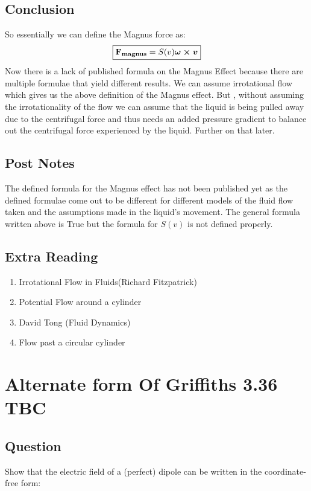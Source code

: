 \documentclass{article}
\begin{document}
\subsection{Conclusion}
So essentially we can define the Magnus force as:
\begin{align*}
\fbox{$\vb{F_{magnus}} = S(v)\vb*{\omega\times v}$}
\end{align*}
Now there is a lack of published formula on the Magnus Effect because there are multiple formulae that yield different results. We can assume irrotational flow which gives us the above definition of the Magnus effect. But , without assuming the irrotationality of the flow we can assume that the liquid is being pulled away due to the centrifugal force and thus needs an added pressure gradient to balance out the centrifugal force experienced by the liquid. Further on that later.
\subsection{Post Notes}
The defined formula for the Magnus effect has not been published yet as the defined formulae come out to be different for different models of the fluid flow taken and the assumptions made in the liquid's movement. The general formula written above is True but the formula for $S(v)$ is not defined properly.
\subsection{Extra Reading}
\begin{enumerate}
    \item Irrotational Flow in Fluids(Richard Fitzpatrick)
    \item Potential Flow around a cylinder
    \item David Tong (Fluid Dynamics)
    \item Flow past a circular cylinder
\end{enumerate}
\section{Alternate form Of Griffiths 3.36 TBC}
\subsection{Question}
\begin{question}
Show that the electric field of a (perfect) dipole can be
written in the coordinate-free form:\\ 
\end{question}
\end{document}
